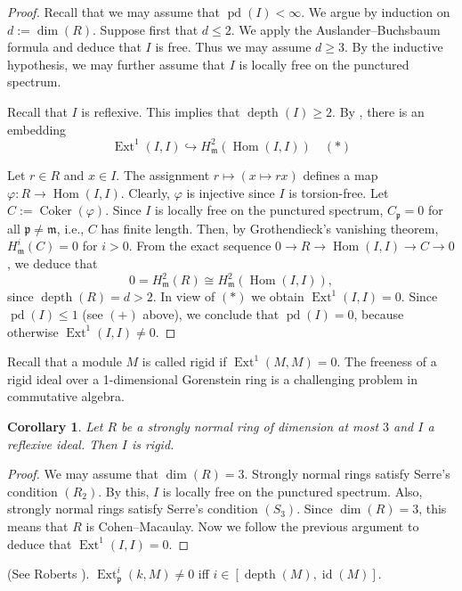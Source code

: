\documentclass[11.05pt,a4paper]{amsart}
\newtheorem{corollary}[theorem]{Corollary}
\theoremstyle{definition}
\theoremstyle{remark}
\newcommand{\id}{\operatorname{id}}
\newcommand{\pd}{\operatorname{pd}}
\newcommand{\Ext}{\operatorname{Ext}}
\newcommand{\Hom}{\operatorname{Hom}}
\newcommand{\depth}{\operatorname{depth}}
\newcommand{\Coker}{\operatorname{Coker}}
\begin{document}
\begin{proof}
	Recall that we may assume that $\pd(I) < \infty$.
	We argue by induction on $d:=\dim (R)$.
	Suppose first that $d\leq 2$. We apply the  Auslander–Buchsbaum formula and deduce that $I$ is free. 
Thus we may assume $d \geq 3$. By the inductive hypothesis, we may further assume that $I$ is locally free on the punctured spectrum.
	
	Recall that $I$ is reflexive. This implies that $\depth(I) \geq 2$. By \cite[Lemma 3.2]{ACS}, there is an embedding
	\[
	\Ext^1(I,I) \hookrightarrow H^2_{\mathfrak{m}}(\Hom(I,I)) 
	\quad(\ast)
	\]
	
	Let $r\in R$ and $x\in I$. The assignment
	$r \mapsto (x \mapsto rx)$
	defines a map $\varphi: R \to \Hom(I,I)$.  
	Clearly, $\varphi$ is injective since $I$ is torsion-free. Let $C := \Coker(\varphi)$.
	Since $I$ is locally free on the punctured spectrum, 
	$C_\mathfrak{p} = 0$ for all $\mathfrak{p} \neq \mathfrak{m}$,
	i.e., $C$ has finite length.	
	Then, by Grothendieck's vanishing theorem, $H^i_{\mathfrak{m}}(C) = 0$ for $i > 0$.
	From the exact sequence $0 \rightarrow R \rightarrow \Hom(I,I) \rightarrow C \rightarrow 0$,
	we deduce that
	\[
	0= H^2_{\mathfrak{m}}(R) \cong H^2_{\mathfrak{m}}(\Hom(I,I)),
	\]
	since $\depth(R)=d>2$. In view of $(\ast)$ we obtain
	$\Ext^1(I,I) = 0$.
	Since $\pd(I) \leq 1$ (see $(+)$ above), we conclude that $\pd(I) = 0$, because otherwise $\Ext^1(I,I) \neq 0$.
\end{proof}

Recall that a module $M$ is called rigid if $\Ext^1(M,M)=0$. The freeness of a rigid ideal over a 1-dimensional Gorenstein ring is a challenging problem in commutative algebra.

\begin{corollary}
	Let $R$ be a strongly normal ring of dimension at most $3$ and $I$ a reflexive ideal. Then $I$ is rigid.
\end{corollary}

\begin{proof}
	We may assume that $\dim(R)=3$. Strongly normal rings satisfy Serre's condition $(R_2)$. By this, $I$ is locally free on the punctured spectrum. Also, strongly normal rings satisfy Serre's condition $(S_3)$. Since $\dim(R)=3$, this means that $R$ is Cohen–Macaulay. Now we follow the previous argument to deduce that $\Ext^1(I,I) = 0$.
\end{proof}

\begin{fact}\label{rob}
	(See Roberts \cite[Theorem 2]{Ro2}). $\Ext^i_{\mathfrak{p}}(k, M) \neq 0$ iff $i \in [\depth(M), \id(M)]$.  
\end{fact}
\end{document}
